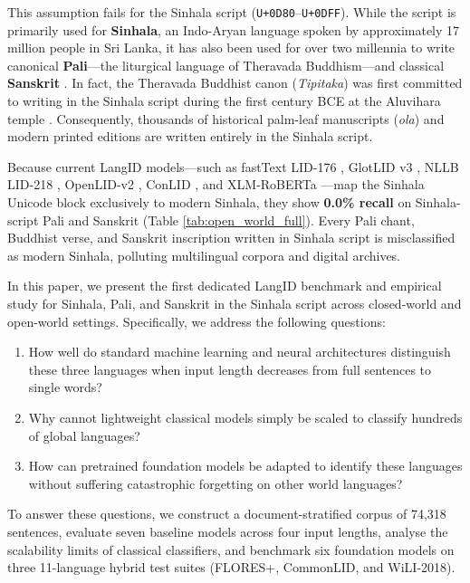 \documentclass[11pt]{article}
\begin{document}
This assumption fails for the Sinhala script (\texttt{U+0D80}--\texttt{U+0DFF}). While the script is primarily used for \textbf{Sinhala}, an Indo-Aryan language spoken by approximately 17 million people in Sri Lanka, it has also been used for over two millennia to write canonical \textbf{Pali}---the liturgical language of Theravada Buddhism---and classical \textbf{Sanskrit} \cite{Walshe_1983}. In fact, the Theravada Buddhist canon (\textit{Tipitaka}) was first committed to writing in the Sinhala script during the first century BCE at the Aluvihara temple \cite{adiga2006ancient}. Consequently, thousands of historical palm-leaf manuscripts (\textit{ola}) and modern printed editions are written entirely in the Sinhala script.

Because current LangID models---such as fastText LID-176 \cite{joulin-etal-2017-bag}, GlotLID v3 \cite{kargaran-etal-2023-glotlid}, NLLB LID-218 \cite{costa2022no}, OpenLID-v2 \cite{burchell-etal-2023-open}, ConLID \cite{foroutan-etal-2026-conlid}, and XLM-RoBERTa \cite{conneau-etal-2020-unsupervised}---map the Sinhala Unicode block exclusively to modern Sinhala, they show \textbf{0.0\% recall} on Sinhala-script Pali and Sanskrit (Table \ref{tab:open_world_full}). Every Pali chant, Buddhist verse, and Sanskrit inscription written in Sinhala script is misclassified as modern Sinhala, polluting multilingual corpora and digital archives.

In this paper, we present the first dedicated LangID benchmark and empirical study for Sinhala, Pali, and Sanskrit in the Sinhala script across closed-world and open-world settings. Specifically, we address the following questions:
\begin{enumerate}
    \item How well do standard machine learning and neural architectures distinguish these three languages when input length decreases from full sentences to single words?
    \item Why cannot lightweight classical models simply be scaled to classify hundreds of global languages?
    \item How can pretrained foundation models be adapted to identify these languages without suffering catastrophic forgetting on other world languages?
\end{enumerate}

To answer these questions, we construct a document-stratified corpus of 74,318 sentences, evaluate seven baseline models across four input lengths, analyse the scalability limits of classical classifiers, and benchmark six foundation models on three 11-language hybrid test suites (FLORES+, CommonLID, and WiLI-2018).
\end{document}
